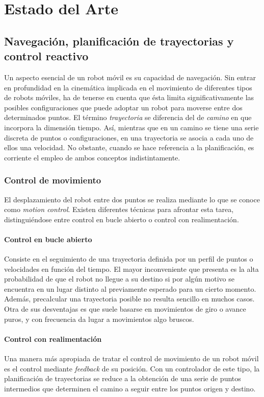 
\chapter{Estado del Arte}

\section{Navegación, planificación de trayectorias y control reactivo}
Un aspecto esencial de un robot móvil es su capacidad de navegación. Sin entrar en profundidad en la cinemática implicada en el movimiento de diferentes tipos de robots móviles, ha de tenerse en cuenta que ésta limita significativamente las posibles configuraciones que puede adoptar un robot para moverse entre dos determinados puntos. El término \emph{trayectoria} se diferencia del de \emph{camino} en que incorpora la dimensión tiempo. Así, mientras que en un camino se tiene una serie discreta de puntos o configuraciones, en una trayectoria se asocia a cada uno de ellos una velocidad. No obstante, cuando se hace referencia a la planificación, es corriente el empleo de ambos conceptos indistintamente.

\subsection{Control de movimiento}
El desplazamiento del robot entre dos puntos se realiza mediante lo que se conoce como \emph{motion control}. Existen diferentes técnicas para afrontar esta tarea, distinguiéndose entre control en bucle abierto o control con realimentación\cite{Siegwart04}.
\subsubsection{Control en bucle abierto}
Consiste en el seguimiento de una trayectoria definida por un perfil de puntos o velocidades en función del tiempo. El mayor inconveniente que presenta es la alta probabilidad de que el robot no llegue a su destino si por algún motivo se encuentra en un lugar distinto al previamente esperado para un cierto momento. Además, precalcular una trayectoria posible no resulta sencillo en muchos casos. Otra de sus desventajas es que suele basarse en movimientos de giro o avance puros, y con frecuencia da lugar a movimientos algo bruscos.
\subsubsection{Control con realimentación}
Una manera más apropiada de tratar el control de movimiento de un robot móvil es el control mediante \emph{feedback} de su posición. Con un controlador de este tipo, la planificación de trayectorias se reduce a la obtención de una serie de puntos intermedios que determinen el camino a seguir entre los puntos origen y destino.

